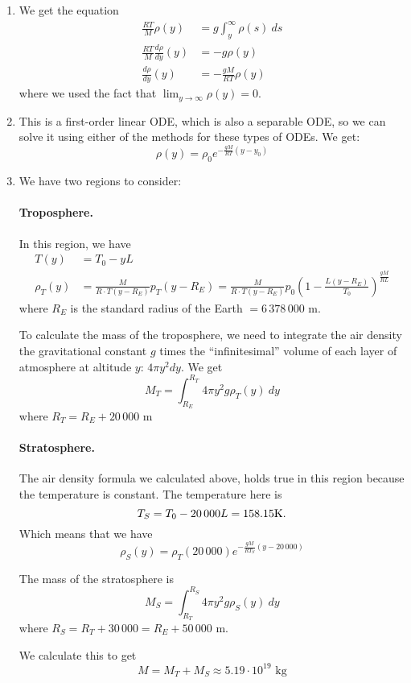 \begin{enumerate}
\begin{enumerate}
\item We get the equation
\begin{align*}
	\frac{RT}{M} \rho(y) & = g \int_y^\infty \rho(s) ~ds \\
	\frac{RT}{M} \frac{d\rho}{dy}(y) & = - g \rho(y) \\
	\frac{d\rho}{dy}(y) & = - \frac{gM}{RT} \rho(y)
\end{align*}
where we used the fact that $\displaystyle\lim_{y \to \infty} \rho(y) = 0$.


\item This is a first-order linear ODE, which is also a separable ODE, so we can solve it using either of the methods for these types of ODEs. 
We get:
\[ 
\rho(y) = \rho_0 e^{-\frac{gM}{RT} (y-y_0)}
\]
		

\item We have two regions to consider:

\paragraph{Troposphere.} In this region, we have
\begin{align*}
T(y) & = T_0 - y L \\
\rho_T(y) & = \frac{M}{R\cdot T(y-R_E)} p_T(y-R_E)
	= \frac{M}{R\cdot T(y-R_E)} p_0 \left( 1 - \frac{L(y-R_E)}{T_0} \right)^{\frac{gM}{RL}}
\end{align*}
where $R_E$ is the standard radius of the Earth $= 6\,378\,000$ m.

To calculate the mass of the troposphere, we need to integrate the air density the gravitational constant $g$ times the ``infinitesimal'' volume of each layer of atmosphere at altitude $y$: $4 \pi y^2 dy$. We get 
\[ 
M_T = \int_{R_E}^{R_T} 4 \pi y^2 g\rho_T(y) ~dy
\]
where $R_T = R_E + 20\,000$ m

\paragraph{Stratosphere.} The air density formula we calculated above, holds true in this region because the temperature is constant. The temperature here is
\[ 
T_S = T_0 - 20\,000 L = 158.15 {\rm K}.
\]
Which means that we have
\[
\rho_S(y) = \rho_T(20\,000) e^{-\frac{gM}{RT_S} (y-20\,000)}
\]

The mass of the stratosphere is
\[
M_S = \int_{R_T}^{R_S} 4 \pi y^2 g\rho_S(y) ~dy
\]
where $R_S = R_T + 30\,000 = R_E + 50\,000$ m.

We calculate this to get
\[
M = M_T + M_S \approx 5.19 \cdot 10^{19} \text{ kg}
\]



\end{enumerate}
\end{enumerate}
